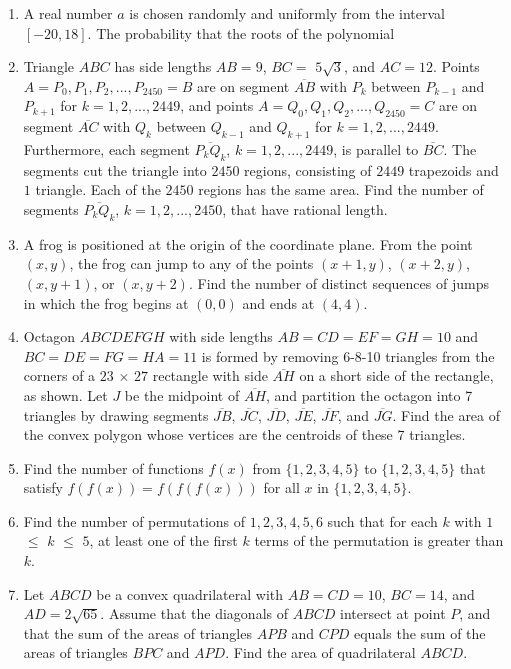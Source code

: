 \documentclass{article}%
\begin{document}
\begin{enumerate}
%
\item%
[\textbf{Problem 6}]A real number $a$ is chosen randomly and uniformly from the interval $[-20, 18]$. The probability that the roots of the polynomial
%
\item%
[\textbf{Problem 7}]Triangle $ABC$ has side lengths $AB = 9$, $BC =$ $5\sqrt{3}$, and $AC = 12$. Points $A = P_{0}, P_{1}, P_{2}, ... , P_{2450} = B$ are on segment $\overline{AB}$ with $P_{k}$ between $P_{k-1}$ and $P_{k+1}$ for $k = 1, 2, ..., 2449$, and points $A = Q_{0}, Q_{1}, Q_{2}, ... , Q_{2450} = C$ are on segment $\overline{AC}$ with $Q_{k}$ between $Q_{k-1}$ and $Q_{k+1}$ for $k = 1, 2, ..., 2449$. Furthermore, each segment $\overline{P_{k}Q_{k}}$, $k = 1, 2, ..., 2449$, is parallel to $\overline{BC}$. The segments cut the triangle into $2450$ regions, consisting of $2449$ trapezoids and $1$ triangle. Each of the $2450$ regions has the same area. Find the number of segments $\overline{P_{k}Q_{k}}$, $k = 1, 2, ..., 2450$, that have rational length.
%
\item%
[\textbf{Problem 8}]A frog is positioned at the origin of the coordinate plane. From the point $(x, y)$, the frog can jump to any of the points $(x + 1, y)$, $(x + 2, y)$, $(x, y + 1)$, or $(x, y + 2)$. Find the number of distinct sequences of jumps in which the frog begins at $(0, 0)$ and ends at $(4, 4)$.
%
\item%
[\textbf{Problem 9}]Octagon $ABCDEFGH$ with side lengths $AB = CD = EF = GH = 10$ and $BC = DE = FG = HA = 11$ is formed by removing 6-8-10 triangles from the corners of a $23$ $\times$ $27$ rectangle with side $\overline{AH}$ on a short side of the rectangle, as shown. Let $J$ be the midpoint of $\overline{AH}$, and partition the octagon into 7 triangles by drawing segments $\overline{JB}$, $\overline{JC}$, $\overline{JD}$, $\overline{JE}$, $\overline{JF}$, and $\overline{JG}$. Find the area of the convex polygon whose vertices are the centroids of these 7 triangles.
%
\item%
[\textbf{Problem 10}]Find the number of functions $f(x)$ from $\{1, 2, 3, 4, 5\}$ to $\{1, 2, 3, 4, 5\}$ that satisfy $f(f(x)) = f(f(f(x)))$ for all $x$ in $\{1, 2, 3, 4, 5\}$.
%
\item%
[\textbf{Problem 11}]Find the number of permutations of $1, 2, 3, 4, 5, 6$ such that for each $k$ with $1$ $\leq$ $k$ $\leq$ $5$, at least one of the first $k$ terms of the permutation is greater than $k$.
%
\item%
[\textbf{Problem 12}]Let $ABCD$ be a convex quadrilateral with $AB = CD = 10$, $BC = 14$, and $AD = 2\sqrt{65}$. Assume that the diagonals of $ABCD$ intersect at point $P$, and that the sum of the areas of triangles $APB$ and $CPD$ equals the sum of the areas of triangles $BPC$ and $APD$. Find the area of quadrilateral $ABCD$.

\end{enumerate}
\end{document}
